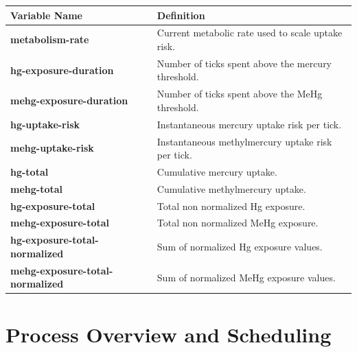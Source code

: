 \documentclass[
]{book}
\begin{document}
\begin{longtable}[]{@{}
  >{\raggedright\arraybackslash}p{}
  >{\raggedright\arraybackslash}p{}@{}}
\toprule\noalign{}
\begin{minipage}[b]{\linewidth}\raggedright
Variable Name
\end{minipage} & \begin{minipage}[b]{\linewidth}\raggedright
Definition
\end{minipage} \\
\midrule\noalign{}
\endhead
\bottomrule\noalign{}
\endlastfoot
\textbf{metabolism-rate} & Current metabolic rate used to scale uptake risk. \\
\textbf{hg-exposure-duration} & Number of ticks spent above the mercury threshold. \\
\textbf{mehg-exposure-duration} & Number of ticks spent above the MeHg threshold. \\
\textbf{hg-uptake-risk} & Instantaneous mercury uptake risk per tick. \\
\textbf{mehg-uptake-risk} & Instantaneous methylmercury uptake risk per tick. \\
\textbf{hg-total} & Cumulative mercury uptake. \\
\textbf{mehg-total} & Cumulative methylmercury uptake. \\
\textbf{hg-exposure-total} & Total non normalized Hg exposure. \\
\textbf{mehg-exposure-total} & Total non normalized MeHg exposure. \\
\textbf{hg-exposure-total-normalized} & Sum of normalized Hg exposure values. \\
\textbf{mehg-exposure-total-normalized} & Sum of normalized MeHg exposure values. \\
\end{longtable}

\section{Process Overview and Scheduling}\label{process-overview-and-scheduling-4}
\end{document}

